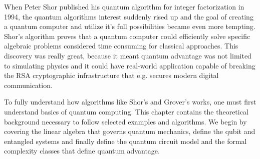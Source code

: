 When Peter Shor published his quantum algorithm for integer factorization \cite{shor1994} in 1994, the quantum algorithms interest suddenly rised up and 
the goal of creating a quantum computer and utilize it's full possibilities became even more tempting. 
Shor's algorithm proves that a quantum computer could efficiently solve specific algebraic problems considered time consuming for classical approaches.
This discovery was really great, because it meant quantum advantage was not limited to simulating physics and it could have real-world application capable of breaking the RSA cryptographic 
infrastructure that e.g. secures modern digital communication.
%
%

To fully understand how algorithms like Shor's and Grover's works, one must first understand basics of quantum computing.
This chapter contains the theoretical background necessary to follow selected examples and algorithms. 
We begin by covering the linear algebra that governs quantum mechanics, define the qubit and entangled systems and finally define the quantum circuit model 
and the formal complexity classes that define quantum advantage.